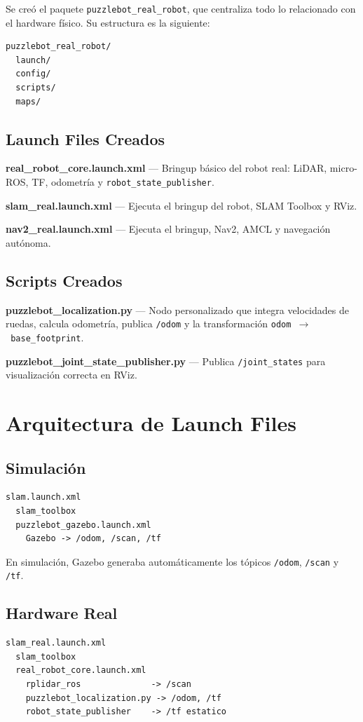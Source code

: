 \documentclass[conference]{IEEEtran}
\begin{document}
Se creó el paquete \texttt{puzzlebot\_real\_robot}, que centraliza todo lo
relacionado con el hardware físico. Su estructura es la siguiente:

\begin{lstlisting}
puzzlebot_real_robot/
  launch/
  config/
  scripts/
  maps/
\end{lstlisting}

\subsection{Launch Files Creados}

\textbf{real\_robot\_core.launch.xml} — Bringup básico del robot real:
LiDAR, micro-ROS, TF, odometría y \texttt{robot\_state\_publisher}.

\textbf{slam\_real.launch.xml} — Ejecuta el bringup del robot, SLAM Toolbox
y RViz.

\textbf{nav2\_real.launch.xml} — Ejecuta el bringup, Nav2, AMCL y navegación
autónoma.

\subsection{Scripts Creados}

\textbf{puzzlebot\_localization.py} — Nodo personalizado que integra
velocidades de ruedas, calcula odometría, publica \texttt{/odom} y la
transformación \texttt{odom~$\rightarrow$~base\_footprint}.

\textbf{puzzlebot\_joint\_state\_publisher.py} — Publica
\texttt{/joint\_states} para visualización correcta en RViz.

\section{Arquitectura de Launch Files}

\subsection{Simulación}
\begin{lstlisting}
slam.launch.xml
  slam_toolbox
  puzzlebot_gazebo.launch.xml
    Gazebo -> /odom, /scan, /tf
\end{lstlisting}

En simulación, Gazebo generaba automáticamente los tópicos \texttt{/odom},
\texttt{/scan} y \texttt{/tf}.

\subsection{Hardware Real}
\begin{lstlisting}
slam_real.launch.xml
  slam_toolbox
  real_robot_core.launch.xml
    rplidar_ros              -> /scan
    puzzlebot_localization.py -> /odom, /tf
    robot_state_publisher    -> /tf estatico
\end{lstlisting}
\end{document}
